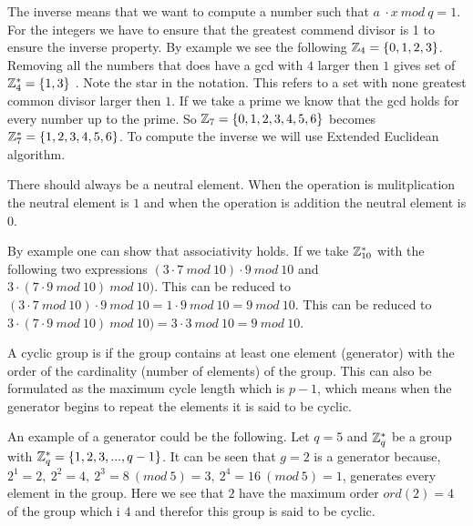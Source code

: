  The inverse means that we want to compute a number such that \begin{math}a\ \cdot x \ mod \ q = 1 \end{math}.  For the integers we have to ensure that the greatest commend divisor is 1 to ensure the inverse property. By example we see the following \begin{math} \mathbb{Z}_4 = \{0,1,2,3\}\end{math}. Removing all the numbers that does have a gcd with $4$ larger then $1$ gives set of $\mathbb{Z}_4^* = \{1,3\}$ . Note the star in the notation. This refers to a set with none greatest common divisor larger then $1$. If we take a prime we know that the gcd holds for every number up to the prime. So  \begin{math} \mathbb{Z}_7 = \{0,1,2,3,4,5,6\}\end{math} becomes \begin{math} \mathbb{Z}_7^* = \{1,2,3,4,5,6\}\end{math}. To compute the inverse we will use Extended Euclidean algorithm.


 There should always be a neutral element. When the operation is mulitplication the neutral element is $1$ and when the operation is addition the neutral element is $0$.

 By example one can show that associativity holds. If we take $ \mathbb{Z}_{10}^*$ with the following two expressions $ (3 \cdot 7 \ mod \ 10) \cdot 9 \ mod \ 10 $ and  $ 3 \cdot ( 7 \cdot 9 \ mod \ 10) \ mod \ 10) $. This can be reduced to $ (3 \cdot 7 \ mod \ 10) \cdot 9 \ mod \ 10 = 1 \cdot 9 \ mod \ 10 = 9 \ mod \ 10$. This can be reduced to $ 3 \cdot ( 7 \cdot 9 \ mod \ 10) \ mod \ 10) = 3 \cdot 3 \ mod \ 10 = 9 \ mod \ 10 $.



 A cyclic group is if the group contains at least one element (generator) with the order of the cardinality (number of elements) of the group. This can also be formulated as the maximum cycle length which is $p-1$, which means when the generator begins to repeat the elements it is said to be cyclic.

 An example of a generator could be the following. Let \begin{math}q=5\end{math} and \begin{math} \mathbb{Z}_q^*\end{math} be a group with \begin{math} \mathbb{Z}_q^* = \{1,2,3,...,q-1\}\end{math}. It can be seen that \begin{math} g=2\end{math} is a generator because,  \begin{math}2^1=2,\ 2^2=4,\ 2^3=8 \ (mod\ 5)=3,\ 2^4=16 \ (mod \ 5)=1 \end{math}, generates every element in the group. Here we see that $2$ have the maximum order $ord(2)=4$ of the group which i $4$ and therefor this group is said to be cyclic.

